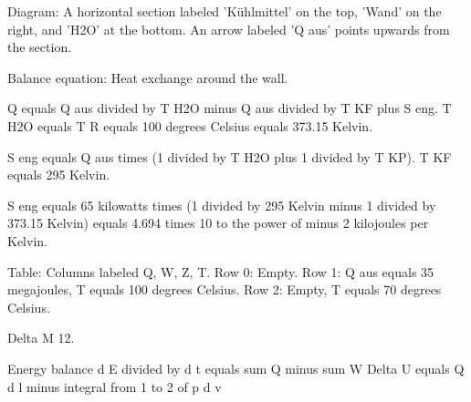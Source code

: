 Diagram: A horizontal section labeled 'Kühlmittel' on the top, 'Wand' on the right, and 'H2O' at the bottom. An arrow labeled 'Q aus' points upwards from the section.

Balance equation: Heat exchange around the wall.

Q equals Q aus divided by T H2O minus Q aus divided by T KF plus S eng. T H2O equals T R equals 100 degrees Celsius equals 373.15 Kelvin.

S eng equals Q aus times (1 divided by T H2O plus 1 divided by T KP). T KF equals 295 Kelvin.

S eng equals 65 kilowatts times (1 divided by 295 Kelvin minus 1 divided by 373.15 Kelvin) equals 4.694 times 10 to the power of minus 2 kilojoules per Kelvin.

Table:
Columns labeled Q, W, Z, T.
Row 0: Empty.
Row 1: Q aus equals 35 megajoules, T equals 100 degrees Celsius.
Row 2: Empty, T equals 70 degrees Celsius.

Delta M 12.

Energy balance  
d E divided by d t equals sum Q minus sum W  
Delta U equals Q d l minus integral from 1 to 2 of p d v